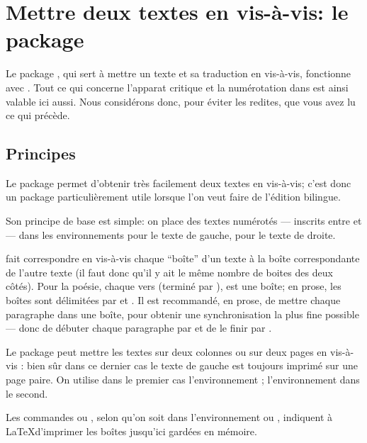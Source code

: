 { 






\section{Mettre deux textes en vis-à-vis: le package }

\begin{prealable}
Le package , qui sert à mettre un texte et sa traduction en vis-à-vis, fonctionne avec . Tout ce qui concerne l'apparat critique et la numérotation dans  est ainsi valable ici aussi. Nous considérons donc, pour éviter les redites, que vous avez lu ce qui précède.
\end{prealable}


\subsection{Principes}

Le package  permet d'obtenir très facilement deux textes en vis-à-vis; c'est donc un package particulièrement utile lorsque l'on veut faire de l'édition bilingue.

Son principe de base est simple: on place des textes numérotés --- inscrits entre  et   --- dans les environnements  pour le texte de gauche,   pour le texte de droite.

 fait correspondre en vis-à-vis chaque \enquote{boîte} d'un texte à la boîte correspondante de l'autre texte (il faut donc qu'il y ait le même nombre de boites des deux côtés). Pour la poésie,  chaque vers  (terminé par \ampersand ), est une boîte;  en prose, les boîtes sont délimitées par   et  .  Il est recommandé, en prose, de mettre chaque paragraphe dans une boîte, pour obtenir une synchronisation la plus fine possible --- donc de débuter chaque paragraphe par  et de le finir par . 


Le package  peut mettre les textes sur deux colonnes ou sur deux pages en vis-à-vis : bien sûr dans ce dernier  cas le texte de gauche est toujours imprimé sur une page paire.
On utilise dans le premier cas l'environnement  ; l'environnement  dans le second.

Les commandes  ou , selon qu'on soit dans l'environnement  ou , indiquent à \LaTeX  d'imprimer les boîtes jusqu'ici gardées en mémoire. 



}
